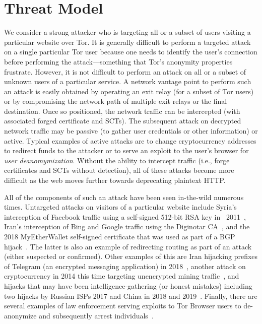 \section{Threat Model} \label{sec:adversary}

We consider a strong attacker who is targeting all or a subset of users visiting
a particular website over Tor. It is generally difficult to perform a targeted
attack on a single particular Tor user because one needs to identify the user's
connection before performing the attack---something that Tor's
anonymity properties frustrate.
However, it is not difficult to perform an attack on all or a subset of unknown
users of a particular service. A network vantage point to perform such an attack
is easily obtained by operating an exit relay (for a subset of Tor users) or by
compromising the network path of multiple exit relays or the final destination.
Once so positioned, the network traffic can be intercepted (with associated
forged certificate and SCTs). The subsequent attack on decrypted network traffic
may be passive (to gather user credentials or other information) or active.
Typical examples of active attacks are to change cryptocurrency addresses to
redirect funds to the attacker or to serve an exploit to the user's browser for
\emph{user deanomymization}. Without the ability to intercept traffic (i.e.,
forge certificates and SCTs without detection), all of these attacks become more
difficult as the web moves further towards deprecating plaintext HTTP.

All of the components of such an attack have been seen in-the-wild
numerous times. Untargeted attacks on visitors of a particular website
include Syria's interception of Facebook traffic using a self-signed
512-bit RSA key in ~2011~\cite{syria-facebook-mitm}, Iran's
interception of Bing and Google traffic using the Diginotar
CA~\cite{diginotar,ct/a}, and the 2018 MyEtherWallet
self-signed certificate that was used as part of a BGP
hijack~\cite{ethereum-hijack-isoc}.  The latter is also an example of
redirecting routing as part of an attack (either suspected or
confirmed). Other examples of this are Iran hijacking prefixes of
Telegram (an encrypted messaging application) in
2018~\cite{iran-telegram-bgp}, another attack on cryptocurrency in
2014 this time targeting unencrypted mining
traffic~\cite{bgp-hijacking-for-crypto},
and hijacks that may have been intelligence-gathering (or honest
mistakes) including two hijacks by Russian ISPs 2017 and China in 2018
and 2019~\cite{wiki-bgp}.  Finally, there are several examples of law
enforcement serving exploits to Tor Browser users to de-anonymize and
subsequently arrest individuals~\cite{forbes-fbi-tor,doj-fbi-tor}.

